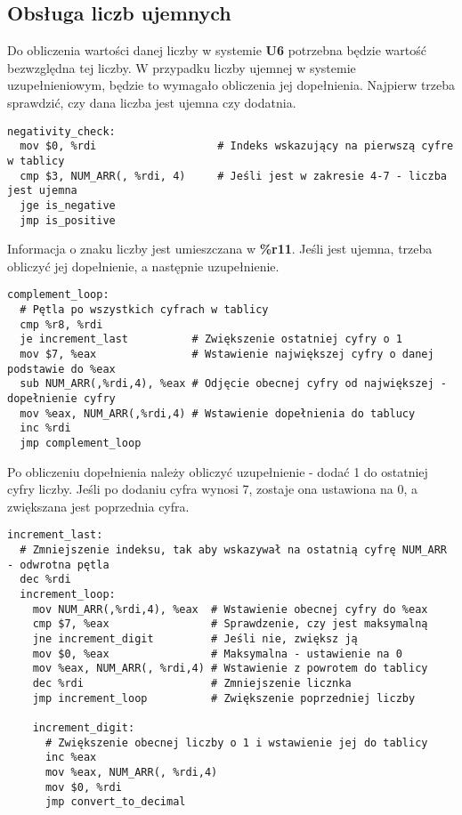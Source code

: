 \documentclass[11pt]{report}
\begin{document}
\subsection{Obsługa liczb ujemnych}
Do obliczenia wartości danej liczby w systemie \textbf{U6} potrzebna będzie wartość bezwzględna tej liczby. W przypadku liczby ujemnej w systemie uzupełnieniowym, będzie to wymagało obliczenia jej dopełnienia. Najpierw trzeba sprawdzić, czy dana liczba jest ujemna czy dodatnia.
\begin{verbatim}
negativity_check:
  mov $0, %rdi                   # Indeks wskazujący na pierwszą cyfre w tablicy
  cmp $3, NUM_ARR(, %rdi, 4)     # Jeśli jest w zakresie 4-7 - liczba jest ujemna
  jge is_negative
  jmp is_positive
\end{verbatim}
Informacja o znaku liczby jest umieszczana w \textbf{\%r11}. Jeśli jest ujemna, trzeba obliczyć jej dopełnienie, a następnie uzupełnienie.
\begin{verbatim}
complement_loop:
  # Pętla po wszystkich cyfrach w tablicy 
  cmp %r8, %rdi              
  je increment_last          # Zwiększenie ostatniej cyfry o 1
  mov $7, %eax               # Wstawienie największej cyfry o danej podstawie do %eax
  sub NUM_ARR(,%rdi,4), %eax # Odjęcie obecnej cyfry od największej - dopełnienie cyfry
  mov %eax, NUM_ARR(,%rdi,4) # Wstawienie dopełnienia do tablucy
  inc %rdi					
  jmp complement_loop
\end{verbatim}
\newpage
\noindent
Po obliczeniu dopełnienia należy obliczyć uzupełnienie - dodać 1 do ostatniej cyfry liczby. Jeśli po dodaniu cyfra wynosi 7, zostaje ona ustawiona na 0, a zwiększana jest poprzednia cyfra.
\begin{verbatim}
increment_last:
  # Zmniejszenie indeksu, tak aby wskazywał na ostatnią cyfrę NUM_ARR - odwrotna pętla
  dec %rdi 
  increment_loop:
    mov NUM_ARR(,%rdi,4), %eax  # Wstawienie obecnej cyfry do %eax
    cmp $7, %eax                # Sprawdzenie, czy jest maksymalną
    jne increment_digit	        # Jeśli nie, zwiększ ją
    mov $0, %eax                # Maksymalna - ustawienie na 0
    mov %eax, NUM_ARR(, %rdi,4) # Wstawienie z powrotem do tablicy
    dec %rdi                    # Zmniejszenie licznka
    jmp increment_loop          # Zwiększenie poprzedniej liczby

	increment_digit:
      # Zwiększenie obecnej liczby o 1 i wstawienie jej do tablicy
      inc %eax
      mov %eax, NUM_ARR(, %rdi,4)
      mov $0, %rdi
      jmp convert_to_decimal
\end{verbatim}
\end{document}
